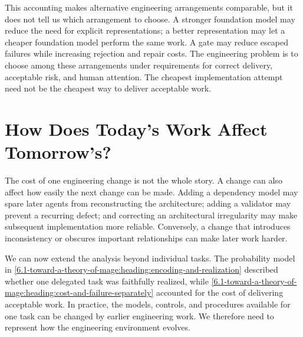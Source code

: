 
This accounting makes alternative engineering arrangements comparable, but it does not tell us which arrangement to choose. A stronger foundation model may reduce the need for explicit representations; a better representation may let a cheaper foundation model perform the same work. A gate may reduce escaped failures while increasing rejection and repair costs. The engineering problem is to choose among these arrangements under requirements for correct delivery, acceptable risk, and human attention. The cheapest implementation attempt need not be the cheapest way to deliver acceptable work.

\section{How Does Today's Work Affect Tomorrow's?}\label{heading:the-dynamic-model}


The cost of one engineering change is not the whole story. A change can also affect how easily the next change can be made. Adding a dependency model may spare later agents from reconstructing the architecture; adding a validator may prevent a recurring defect; and correcting an architectural irregularity may make subsequent implementation more reliable. Conversely, a change that introduces inconsistency or obscures important relationships can make later work harder.

We can now extend the analysis beyond individual tasks. The probability model in \autoref{6.1-toward-a-theory-of-mage:heading:encoding-and-realization} described whether one delegated task was faithfully realized, while \autoref{6.1-toward-a-theory-of-mage:heading:cost-and-failure-separately} accounted for the cost of delivering acceptable work. In practice, the models, controls, and procedures available for one task can be changed by earlier engineering work. We therefore need to represent how the engineering environment evolves.


